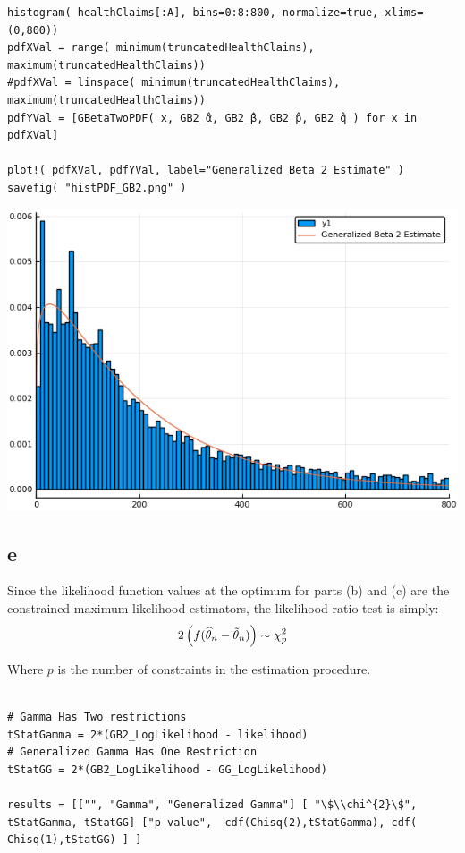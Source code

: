 \documentclass[12pt, letterpaper]{paper}
\begin{document}
\begin{verbatim}
histogram( healthClaims[:A], bins=0:8:800, normalize=true, xlims=(0,800))
pdfXVal = range( minimum(truncatedHealthClaims), maximum(truncatedHealthClaims))
#pdfXVal = linspace( minimum(truncatedHealthClaims), maximum(truncatedHealthClaims))
pdfYVal = [GBetaTwoPDF( x, GB2_̂α, GB2_̂β, GB2_̂p, GB2_̂q ) for x in pdfXVal]

plot!( pdfXVal, pdfYVal, label="Generalized Beta 2 Estimate" )
savefig( "histPDF_GB2.png" )
\end{verbatim}

\begin{center}
\includegraphics[width=.9\linewidth]{histPDF_GB2.png}
\end{center}

\subsection{e}
\label{sec:orga9d99a8}
Since the likelihood function values at the optimum for parts (b) and
(c) are the constrained maximum likelihood estimators, the likelihood
ratio test is simply: 
\begin{equation*}
  2 \left( f( \widehat{ \theta }_{n} - \tilde{ \theta }_{n}) \right) \sim \chi_{p}^{2}
\end{equation*}

Where \(p\) is the number of constraints in the estimation procedure. 
\begin{verbatim}

# Gamma Has Two restrictions
tStatGamma = 2*(GB2_LogLikelihood - likelihood)
# Generalized Gamma Has One Restriction
tStatGG = 2*(GB2_LogLikelihood - GG_LogLikelihood)

results = [["", "Gamma", "Generalized Gamma"] [ "\$\\chi^{2}\$", tStatGamma, tStatGG] ["p-value",  cdf(Chisq(2),tStatGamma), cdf( Chisq(1),tStatGG) ] ]
\end{verbatim}
\end{document}
